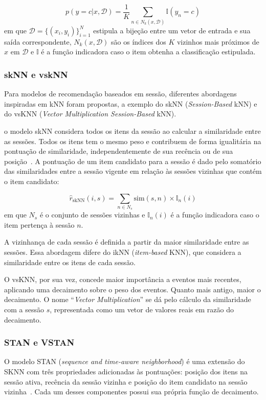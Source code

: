 \begin{equation}
    p(y=c|x, \mathcal{D}) = \frac{1}{K} \sum_{n \in N_k (x, \mathcal{D})} \mathbb{I}(y_n = c)
\end{equation}
em que $\mathcal{D} = \{(x_i, y_i )\}^{N}_{i=1}$ estipula a bijeção
entre um vetor de entrada e sua saída correspondente, $N_k(x, \mathcal{D})$
são os índices dos $K$ vizinhos mais próximos de $x$ em $\mathcal{D}$ e $\mathbb{I}$ é a função
indicadora caso o item obtenha a classificação estipulada.

\subsubsection{skNN e vskNN}
Para modelos de recomendação baseados em sessão, diferentes abordagens inspiradas em kNN
foram propostas, a exemplo do skNN (\textit{Session-Based} kNN) e do vsKNN
(\textit{Vector Multiplication Session-Based} kNN).

o modelo skNN considera todos os itens da sessão ao calcular a similaridade
entre as sessões. Todos os itens tem o mesmo peso e contribuem de forma
igualitária na pontuação de similaridade, independentemente de sua
recência ou de sua posição~\cite{ludewig_2019}. A pontuação de um item candidato para a sessão
é dado pelo somatório das similaridades entre a sessão vigente em relação às sessões vizinhas
que contém o item candidato:

\begin{equation}
    \hat{r}_{\text{skNN}}(i, s) = \sum_{n \in N_s} \text{sim}(s,n) \times \mathbb{I}_n(i)
\end{equation}
em que $N_s$ é o conjunto de sessões vizinhas e $\mathbb{I}_n(i)$ é a função
indicadora caso o item pertença à sessão $n$.

A vizinhança de cada sessão é definida a partir da maior
similaridade entre as sessões. Essa abordagem difere do ikNN
(\textit{item-based} KNN), que considera a similaridade entre os itens de cada
sessão. 

O vsKNN, por sua vez, concede maior importância a eventos mais recentes,
aplicando uma decaimento sobre o peso dos eventos. Quanto mais antigo, maior o
decaimento. O nome ``\textit{Vector Multiplication}'' se dá pelo cálculo da
similaridade com a sessão $s$, representada como um vetor de valores reais em
razão do decaimento.


\subsubsection{STAN e VSTAN}
O modelo STAN (\textit{sequence and time-aware neighborhood}) é uma extensão do
SKNN com três propriedades adicionadas às pontuações: posição dos itens na
sessão ativa, recência da sessão vizinha e posição do item candidato na sessão
vizinha~\cite{garg2019sequence}. Cada um desses componentes possui sua própria função de decaimento.

